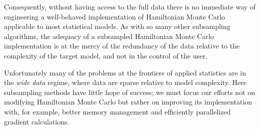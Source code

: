 \documentclass{article}
\begin{document}
Consequently, without having access to the full data there is no immediate way of 
engineering a well-behaved implementation of Hamiltonian Monte Carlo applicable
to most statistical models.  As with so many other subsampling algorithms, the 
adequacy of a subsampled Hamiltonian Monte Carlo implementation is at the mercy 
of the redundancy of the data relative to the complexity of the target model, and not 
in the control of the user.

Unfortunately many of the problems at the frontiers of applied statistics are 
in the \textit{wide data} regime, where data are sparse relative to model 
complexity.  Here subsampling methods have little hope of success;
we must focus our efforts not on modifying Hamiltonian Monte Carlo but rather
on improving its implementation with, for example, better memory management 
and efficiently parallelized gradient calculations.





\end{document}
